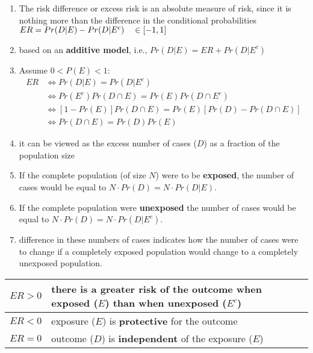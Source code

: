 \begin{enumerate}[itemsep=0.2cm]
    \item The risk difference or excess risk is an absolute measure of risk, since it is nothing more than the difference in the conditional probabilities
    $
        \hfill
        ER = Pr(D|E) - Pr(D|E^c)
        \quad \in [-1, 1]
        \hfill
    $

    \item based on an \textbf{additive model}, i.e., $Pr (D|E) = ER + Pr (D|E^c)$

    \item Assume $0 < P(E) < 1$:
    \begin{align*}
        ER  
        &\Leftrightarrow Pr (D|E) = Pr (D|E^c) \\
        &\Leftrightarrow Pr (E^c) Pr (D \cap E) = Pr (E) Pr (D \cap E^c) \\
        &\Leftrightarrow [1 - Pr (E)] Pr (D \cap E) = Pr (E)[Pr(D) - Pr (D \cap E)] \\
        &\Leftrightarrow Pr (D \cap E) = Pr (D) Pr (E)
    \end{align*}

    \item it can be viewed as the excess number of cases ($D$) as a fraction of the population size

    \item If the complete population (of size $N$) were to be \textbf{exposed}, the number of cases would be equal to $N \cdot Pr (D) = N \cdot Pr (D|E)$.

    \item If the complete population were \textbf{unexposed} the number of cases would be equal to $N \cdot Pr (D) = N \cdot Pr (D|E^c)$.

    \item difference in these numbers of cases indicates how the number of cases were to change if a completely exposed population would change to a completely unexposed population.
\end{enumerate}

\begin{customTableWrapper}{1.5}
\begin{table}[H]
    \centering
    \begin{tabular}{|l|p{9cm}|}
        \hline

        $ER > 0$ & there is a greater risk of the outcome when exposed ($E$) than when unexposed ($E^c$) \\
        \hline

        $ER < 0$ & exposure ($E$) is \textbf{protective} for the outcome \\
        \hline

        $ER = 0$ & outcome ($D$) is \textbf{independent} of the exposure ($E$) \\
        \hline

    \end{tabular}
\end{table}
\end{customTableWrapper}

